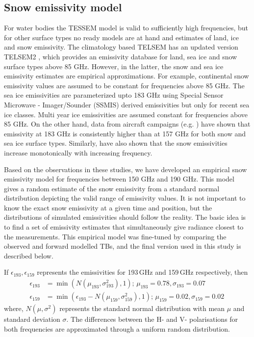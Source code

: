 \documentclass[amt, manuscript]{copernicus}
\begin{document}
\subsection{Snow emissivity model}
\label{sec:snow_emissivity}

For water bodies the TESSEM model is valid to sufficiently high frequencies, but for other surface types no ready models are at hand and estimates of land, ice and snow emissivity. The climatology based TELSEM has an updated version TELSEM2 \citep{wang:surfa:17}, which provides an emissivity database for land, sea ice and snow surface types above 85 GHz. However, in the latter,  the snow and sea ice emissivity estimates are empirical approximations. For example, continental snow emissivity values are assumed to be constant for frequencies above 85 GHz. The sea ice emissivities are parameterized upto 183 GHz using Special Sensor Microwave - Imager/Sounder (SSMIS) derived emissivities \citep{boukabara2011mirs} but only for recent sea ice classes. Multi year ice emissivities are assumed constant for frequencies above 85 GHz. On the other hand, data from aircraft campaigns (e.g. \citet{hewison:2002:airbo}) have shown that emissivity at 183 GHz is consistently higher than at 157 GHz for both snow and sea ice surface types. Similarly, \citet{harlow:2012:tundr} have also shown that the snow emissivities increase monotonically with increasing frequency. 

Based on the observations in these studies, we have developed an empirical snow emissivity model for frequencies between 150\,\,GHz and 190\,\,GHz. This model gives a random estimate of the snow emissivity from a standard normal distribution depicting the valid range of emissivity values. It is not important to know the exact snow emissivity at a given time and position, but the distributions of simulated emissivities should follow the reality. The basic idea is to find a set of emissivity estimates that simultaneously give radiance closest to the measurements. This empirical model was fine-tuned by comparing the observed and forward modelled TBs, and the final version used in this study is described below. 

If $\epsilon_{193}, \epsilon_{159}$ represents the emissivities for 193\,GHz and
159\,GHz respectively, then
\begin{align}
\epsilon_{193}& = \min({N(\mu_{193}, \sigma_{193}^{2}), 1});\, \mu_{193} = 0.78, \sigma_{193} = 0.07 \label{eq:1}\\
\epsilon_{159}& = \min(\epsilon_{193} - N(\mu_{159}, \sigma_{159}^{2}), 1) ;\,  \mu_{159} = 0.02, \sigma_{159} = 0.02\,\label{eq:2}
\end{align}
where, $N(\mu, \sigma^{2})$ represents the standard normal distribution with
mean $\mu$ and standard deviation $\sigma$. The differences between the
H- and V- polarisations for both frequencies are 
approximated through a uniform random distribution.
\end{document}
